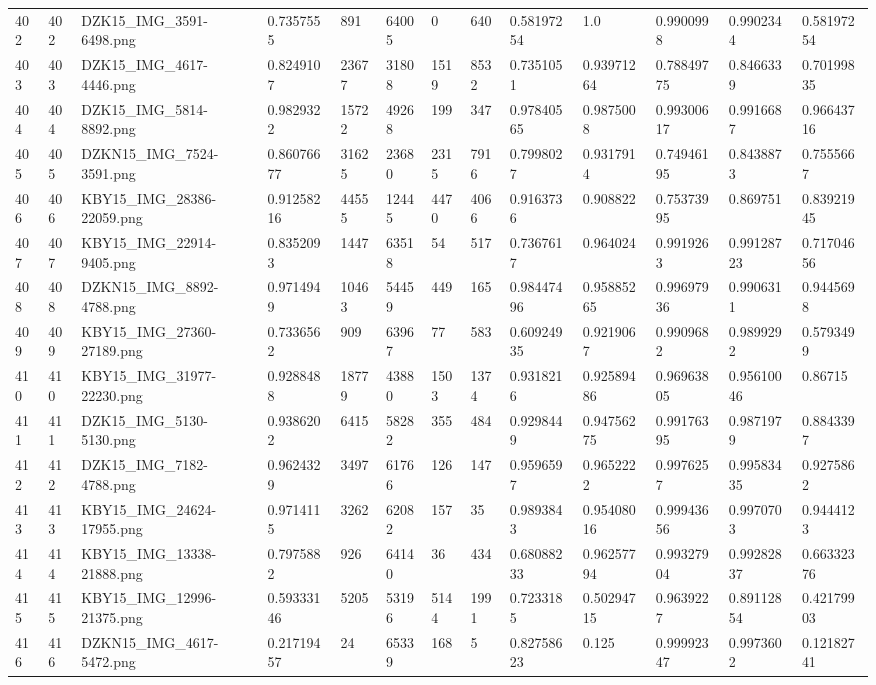 \documentclass[11pt, a4paper, twoside]{report}
\begin{document}
\begin{longtable}[c]{@{}lllllllllllll@{}}
402 & 402 & DZK15\_IMG\_3591-6498.png & 0.7357555 & 891 & 64005 & 0 & 640 & 0.58197254 & 1.0 & 0.9900998 & 0.9902344 & 0.58197254 \\
403 & 403 & DZK15\_IMG\_4617-4446.png & 0.8249107 & 23677 & 31808 & 1519 & 8532 & 0.7351051 & 0.93971264 & 0.78849775 & 0.8466339 & 0.70199835 \\
404 & 404 & DZK15\_IMG\_5814-8892.png & 0.9829322 & 15722 & 49268 & 199 & 347 & 0.97840565 & 0.9875008 & 0.99300617 & 0.9916687 & 0.96643716 \\
405 & 405 & DZKN15\_IMG\_7524-3591.png & 0.86076677 & 31625 & 23680 & 2315 & 7916 & 0.7998027 & 0.9317914 & 0.74946195 & 0.8438873 & 0.7555667 \\
406 & 406 & KBY15\_IMG\_28386-22059.png & 0.91258216 & 44555 & 12445 & 4470 & 4066 & 0.9163736 & 0.908822 & 0.75373995 & 0.869751 & 0.83921945 \\
407 & 407 & KBY15\_IMG\_22914-9405.png & 0.8352093 & 1447 & 63518 & 54 & 517 & 0.7367617 & 0.964024 & 0.9919263 & 0.99128723 & 0.71704656 \\
408 & 408 & DZKN15\_IMG\_8892-4788.png & 0.9714949 & 10463 & 54459 & 449 & 165 & 0.98447496 & 0.95885265 & 0.99697936 & 0.9906311 & 0.9445698 \\
409 & 409 & KBY15\_IMG\_27360-27189.png & 0.7336562 & 909 & 63967 & 77 & 583 & 0.60924935 & 0.9219067 & 0.9909682 & 0.9899292 & 0.5793499 \\
410 & 410 & KBY15\_IMG\_31977-22230.png & 0.9288488 & 18779 & 43880 & 1503 & 1374 & 0.9318216 & 0.92589486 & 0.96963805 & 0.95610046 & 0.86715 \\
411 & 411 & DZK15\_IMG\_5130-5130.png & 0.9386202 & 6415 & 58282 & 355 & 484 & 0.9298449 & 0.94756275 & 0.99176395 & 0.9871979 & 0.8843397 \\
412 & 412 & DZK15\_IMG\_7182-4788.png & 0.9624329 & 3497 & 61766 & 126 & 147 & 0.9596597 & 0.9652222 & 0.9976257 & 0.99583435 & 0.9275862 \\
413 & 413 & KBY15\_IMG\_24624-17955.png & 0.9714115 & 3262 & 62082 & 157 & 35 & 0.9893843 & 0.95408016 & 0.99943656 & 0.9970703 & 0.9444123 \\
414 & 414 & KBY15\_IMG\_13338-21888.png & 0.7975882 & 926 & 64140 & 36 & 434 & 0.68088233 & 0.96257794 & 0.99327904 & 0.99282837 & 0.66332376 \\
415 & 415 & KBY15\_IMG\_12996-21375.png & 0.59333146 & 5205 & 53196 & 5144 & 1991 & 0.7233185 & 0.50294715 & 0.9639227 & 0.89112854 & 0.42179903 \\
416 & 416 & DZKN15\_IMG\_4617-5472.png & 0.21719457 & 24 & 65339 & 168 & 5 & 0.82758623 & 0.125 & 0.99992347 & 0.9973602 & 0.12182741 \\

\end{longtable}
\end{document}
